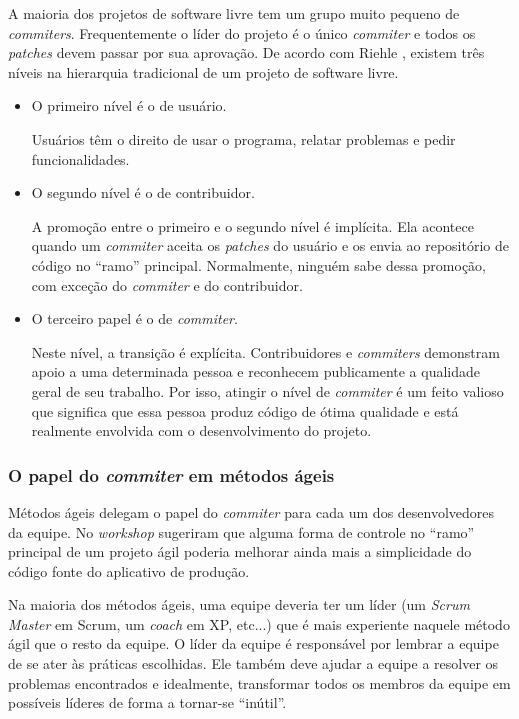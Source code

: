 A maioria dos projetos de software livre tem um grupo muito pequeno de
\emph{commiters}. Frequentemente o líder do projeto é o único
\emph{commiter} e todos os \emph{patches} devem passar por sua
aprovação. De acordo com Riehle \cite{Riehle2007}, existem três níveis
na hierarquia tradicional de um projeto de software livre.
\begin{itemize}
\item O primeiro nível é o de usuário.

  Usuários têm o direito de usar o programa, relatar problemas e pedir
  funcionalidades.
\item O segundo nível é o de contribuidor.

  A promoção entre o primeiro e o segundo nível é implícita. Ela
  acontece quando um \emph{commiter} aceita os \emph{patches} do
  usuário e os envia ao repositório de código no ``ramo''
  principal. Normalmente, ninguém sabe dessa promoção, com exceção do
  \emph{commiter} e do contribuidor.
\item O terceiro papel é o de \emph{commiter}.

  Neste nível, a transição é explícita. Contribuidores e
  \emph{commiters} demonstram apoio a uma determinada pessoa e
  reconhecem publicamente a qualidade geral de seu trabalho. Por isso,
  atingir o nível de \emph{commiter} é um feito valioso que significa
  que essa pessoa produz código de ótima qualidade e está realmente
  envolvida com o desenvolvimento do projeto.
\end{itemize}

\subsubsection{O papel do \emph{commiter} em métodos ágeis}

Métodos ágeis delegam o papel do \emph{commiter} para cada um dos
desenvolvedores da equipe. No \emph{workshop} sugeriram que alguma
forma de controle no ``ramo'' principal de um projeto ágil poderia
melhorar ainda mais a simplicidade do código fonte do aplicativo de
produção.

Na maioria dos métodos ágeis, uma equipe deveria ter um líder (um
\emph{Scrum Master} em Scrum, um \emph{coach} em XP, etc...)  que é
mais experiente naquele método ágil que o resto da equipe. O líder da
equipe é responsável por lembrar a equipe de se ater às práticas
escolhidas. Ele também deve ajudar a equipe a resolver os problemas
encontrados e idealmente, transformar todos os membros da equipe em
possíveis líderes de forma a tornar-se ``inútil''.

